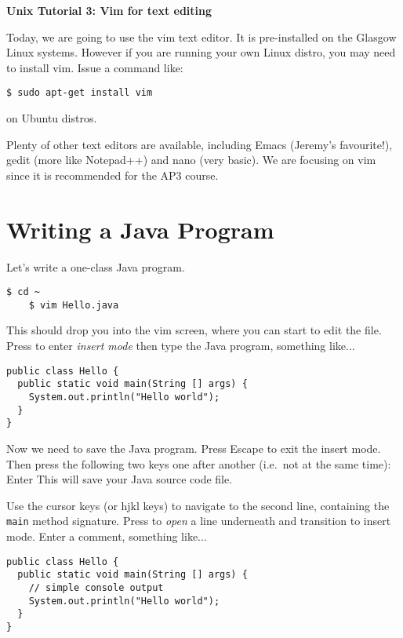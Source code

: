 \documentclass{article}
\begin{document}
\noindent
{\Large \textsf{\textbf{Unix Tutorial 3: Vim for text editing}}}

\bigskip


Today, we are going to use the vim text editor. It is pre-installed on the Glasgow Linux systems. However if you are running your own Linux distro, you may need to install vim. Issue a command like:
\begin{lstlisting}[style=BashInputStyle]
    $ sudo apt-get install vim
\end{lstlisting}
on Ubuntu distros.

Plenty of other text editors are available, including Emacs (Jeremy's favourite!), gedit (more like Notepad++) and nano (very basic). We are focusing on vim since it is recommended for the AP3 course.

\section*{Writing a Java Program}

Let's write a one-class Java program. 

\begin{lstlisting}[style=BashInputStyle]
    $ cd ~
    $ vim Hello.java
\end{lstlisting}

This should drop you into the vim screen, where you can start to edit the file. Press  to enter \textit{insert mode} then type the Java program, something like...

\begin{lstlisting}[style=JavaProg]
public class Hello {
  public static void main(String [] args) {
    System.out.println("Hello world");
  }
}
\end{lstlisting}

Now we need to save the Java program. Press Escape to exit the insert mode. Then press the following two keys one after another (i.e.\ not at the same time): \keys{:}  Enter
This will save your Java source code file.

Use the cursor keys (or hjkl keys) to navigate to the second line, containing the \texttt{main} method signature. Press  to \textit{open} a line underneath and transition to insert mode. Enter a comment, something like...
\begin{lstlisting}[style=JavaProg]
public class Hello {
  public static void main(String [] args) {
    // simple console output
    System.out.println("Hello world");
  }
}
\end{lstlisting}
\end{document}
